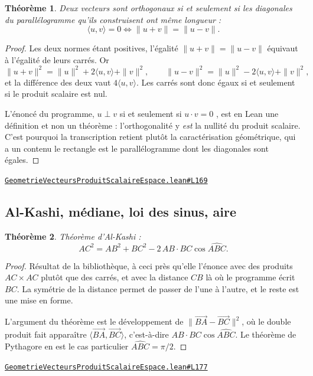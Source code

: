 \documentclass[11pt,a4paper]{article}
\theoremstyle{definition}
\theoremstyle{plain}
\newtheorem{theoreme}{Théorème}
\newcommand{\source}[2]{\par\smallskip\noindent\hfill{\footnotesize\href{#1}{\texttt{#2}}}\par\smallskip}
\begin{document}
\begin{theoreme}
Deux vecteurs sont orthogonaux si et seulement si les diagonales du parallélogramme qu'ils
construisent ont même longueur :
\[ \langle u, v\rangle = 0 \iff \|u + v\| = \|u - v\| . \]
\end{theoreme}

\begin{proof}
Les deux normes étant positives, l'égalité $\|u+v\| = \|u-v\|$ équivaut à l'égalité de
leurs carrés. Or
\[ \|u + v\|^{2} = \|u\|^{2} + 2\langle u, v\rangle + \|v\|^{2} , \qquad
   \|u - v\|^{2} = \|u\|^{2} - 2\langle u, v\rangle + \|v\|^{2} , \]
et la différence des deux vaut $4\langle u, v\rangle$. Les carrés sont donc égaux si et
seulement si le produit scalaire est nul.

\medskip\noindent
L'énoncé du programme, \og{} $u \perp v$ si et seulement si $u \cdot v = 0$ \fg{}, est en
Lean une définition et non un théorème : l'orthogonalité y \emph{est} la nullité du
produit scalaire. C'est pourquoi la transcription retient plutôt la caractérisation
géométrique, qui a un contenu \textemdash{} le rectangle est le parallélogramme dont les
diagonales sont égales.
\end{proof}
\source{https://github.com/Commutator-IO/learn-lean/blob/main/cours/02-lycee/08-geometrie-vecteurs-produit-scalaire-espace/GeometrieVecteursProduitScalaireEspace.lean\#L169}{GeometrieVecteursProduitScalaireEspace.lean\#L169}

\subsection{Al-Kashi, médiane, loi des sinus, aire}

\begin{theoreme}
Théorème d'Al-Kashi :
\[ AC^{2} = AB^{2} + BC^{2} - 2\,AB \cdot BC \cos\widehat{ABC} . \]
\end{theoreme}

\begin{proof}
Résultat de la bibliothèque, à ceci près qu'elle l'énonce avec des produits
$AC \times AC$ plutôt que des carrés, et avec la distance $CB$ là où le programme écrit
$BC$. La symétrie de la distance permet de passer de l'une à l'autre, et le reste est une
mise en forme.

L'argument du théorème est le développement de
$\|\overrightarrow{BA} - \overrightarrow{BC}\|^{2}$, où le double produit fait apparaître
$\langle \overrightarrow{BA}, \overrightarrow{BC}\rangle$, c'est-à-dire
$AB \cdot BC \cos\widehat{ABC}$. Le théorème de Pythagore en est le cas particulier
$\widehat{ABC} = \pi/2$.
\end{proof}
\source{https://github.com/Commutator-IO/learn-lean/blob/main/cours/02-lycee/08-geometrie-vecteurs-produit-scalaire-espace/GeometrieVecteursProduitScalaireEspace.lean\#L177}{GeometrieVecteursProduitScalaireEspace.lean\#L177}
\end{document}
